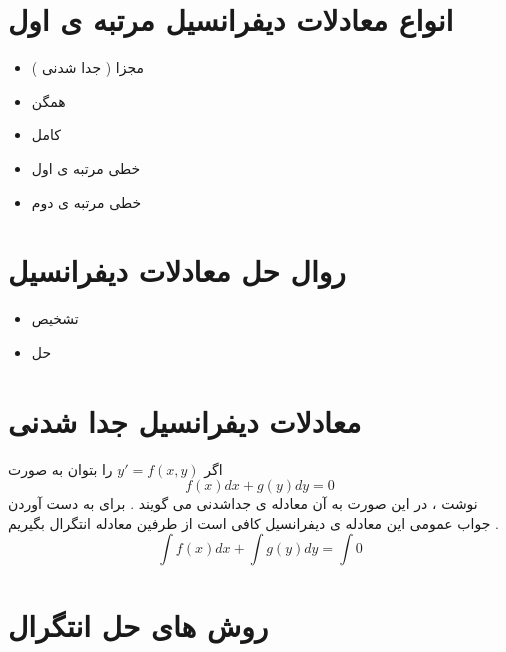 \documentclass[12pt]{book}
\begin{document}
\begin{center}
\end{center}


\section{انواع معادلات دیفرانسیل مرتبه ی اول}

\begin{tcolorbox}
\begin{itemize}
	\item مجزا ( جدا شدنی )
	\item همگن
	\item کامل
	\item خطی مرتبه ی اول
	\item خطی مرتبه ی دوم
\end{itemize}
\end{tcolorbox}


\section{روال حل معادلات دیفرانسیل}

\begin{tcolorbox}
\begin{itemize}
	\item تشخیص 
	\item حل
\end{itemize}
\end{tcolorbox}


\section{معادلات دیفرانسیل جدا شدنی}

اگر
$y' = f(x,y)$
را بتوان به صورت 
$$
f(x)dx + g(y)dy = 0
$$
نوشت ، در این صورت به آن معادله ی جداشدنی می گویند .
برای به دست آوردن جواب عمومی این معادله ی دیفرانسیل کافی است از طرفین معادله انتگرال بگیریم .
$$
\int{f(x)dx} + \int{g(y)dy} = \int{0}
$$


\section{روش های حل انتگرال}
\end{document}
